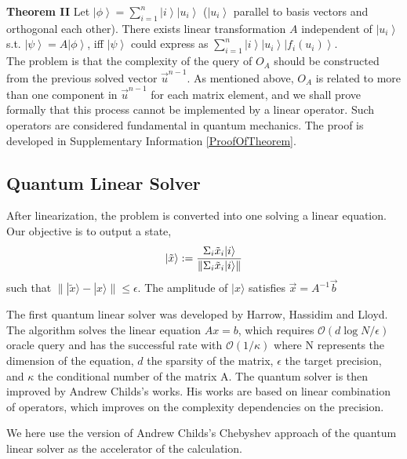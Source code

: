 \documentclass[%
 reprint,
 amsmath,amssymb,
pra,
]{revtex4-1}
\begin{document}
\textbf{Theorem II} Let $\left|\phi\right\rangle = \sum_{i=1}^n \left|i\right\rangle\left|u_i\right\rangle$ ($\left|u_i\right\rangle$ parallel to basis vectors and orthogonal each other). There exists 
linear transformation $A$ independent of $\left|u_{i}\right\rangle$ s.t. $\left|\psi\right\rangle = A\left|\phi\right\rangle$, iff $\left|\psi\right\rangle$ could express as $\sum_{i=1}^n \left|i\right\rangle\left|u_i\right\rangle\left|f_{i}\left(u_i\right)\right\rangle$.
~\\

The problem is that the complexity of the query of $O_A$ should be constructed from the previous solved vector $\vec{u}^{n-1}$. As mentioned above, $O_A$ is related to more than one component in $\vec{u}^{n-1}$ for each matrix element, and we shall prove formally that this process cannot be implemented by a linear operator. Such operators are considered fundamental in quantum mechanics. The proof is developed in Supplementary Information \ref{ProofOfTheorem}.


\subsection{Quantum Linear Solver}

After linearization, the problem is converted into one solving a linear equation. Our objective is to output a state, 
\begin{equation}
|\tilde{x}\rangle:=\frac{\Sigma_i \tilde{x}_i|i\rangle}
{\lVert \Sigma_i \tilde{x}_i |i\rangle\rVert}\notag
\end{equation}
such that $\lVert |\tilde{x}\rangle-|x\rangle\rVert\leqslant\epsilon$. The amplitude of $|x\rangle$ satisfies $\vec{x}=A^{-1}\vec{b}$

The first quantum linear solver was developed by Harrow, Hassidim and Lloyd. The algorithm solves the linear equation $Ax = b$, which requires $\mathcal{O}(d\log N/\epsilon)$ oracle query and has the successful rate with $\mathcal{O}(1/\kappa)$ where N represents the dimension of the equation, $d$ the sparsity of the matrix, $\epsilon$ the target precision, and $\kappa$ the conditional number of the matrix A. The quantum solver is then improved by Andrew Childs’s works. His works are based on linear combination of operators, which improves on the complexity dependencies on the precision.

We here use the version of Andrew Childs's Chebyshev approach of the quantum linear solver as the accelerator of the calculation. 
\end{document}
